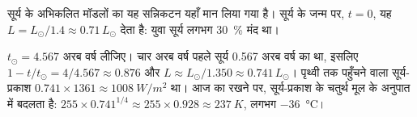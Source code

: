 सूर्य के अभिकलित मॉडलों का यह सन्निकटन यहाँ मान लिया गया है।
सूर्य के जन्म पर, $t = 0$, यह $L = L_\odot/1.4 \approx 0.71\,L_\odot$ देता है:
युवा सूर्य लगभग \qty{30}{\percent} मंद था।

\begin{example}\label{ex:g12:early-earth:young-sun}
$t_\odot = 4.567$ अरब वर्ष लीजिए। चार अरब वर्ष पहले सूर्य
0.567 अरब वर्ष का था, इसलिए $1 - t/t_\odot = 4/4.567 \approx 0.876$ और
$L \approx L_\odot/1.350 \approx 0.741\,L_\odot$। पृथ्वी तक पहुँचने वाला
सूर्य-प्रकाश $0.741 \times 1361 \approx \qty{1008}{W/m^2}$ था। आज का
 रखने पर,  सूर्य-प्रकाश के चतुर्थ मूल के अनुपात में
बदलता है: $255 \times 0.741^{1/4} \approx 255 \times 0.928 \approx
\qty{237}{K}$, लगभग \qty{-36}{\celsius}।
\end{example}

